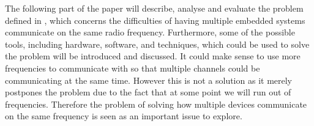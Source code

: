 \bigskip \noindent
The following part of the paper will describe, analyse and evaluate the problem defined in , which concerns the difficulties of having multiple embedded systems communicate on the same radio frequency.
Furthermore, some of the possible tools, including hardware, software, and techniques, which could be used to solve the problem will be introduced and discussed.
It could make sense to use more frequencies to communicate with so that multiple channels could be communicating at the same time.
However this is not a solution as it merely postpones the problem due to the fact that at some point we will run out of frequencies. 
Therefore the problem of solving how multiple devices communicate on the same frequency is seen as an important issue to explore.
